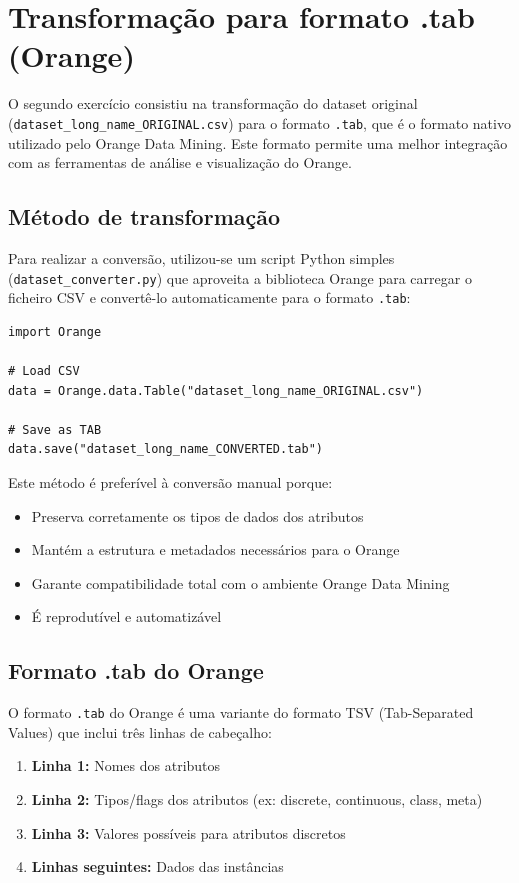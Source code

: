 \documentclass[12pt,a4paper]{article}
\begin{document}
\section{Transformação para formato .tab (Orange)}

O segundo exercício consistiu na transformação do dataset original (\texttt{dataset\_long\_name\_ORIGINAL.csv}) para o formato \texttt{.tab}, que é o formato nativo utilizado pelo Orange Data Mining. Este formato permite uma melhor integração com as ferramentas de análise e visualização do Orange.

\subsection{Método de transformação}

Para realizar a conversão, utilizou-se um script Python simples (\texttt{dataset\_converter.py}) que aproveita a biblioteca Orange para carregar o ficheiro CSV e convertê-lo automaticamente para o formato \texttt{.tab}:

\begin{verbatim}
import Orange

# Load CSV
data = Orange.data.Table("dataset_long_name_ORIGINAL.csv")

# Save as TAB
data.save("dataset_long_name_CONVERTED.tab")
\end{verbatim}

Este método é preferível à conversão manual porque:
\begin{itemize}
    \item Preserva corretamente os tipos de dados dos atributos
    \item Mantém a estrutura e metadados necessários para o Orange
    \item Garante compatibilidade total com o ambiente Orange Data Mining
    \item É reprodutível e automatizável
\end{itemize}

\subsection{Formato .tab do Orange}

O formato \texttt{.tab} do Orange é uma variante do formato TSV (Tab-Separated Values) que inclui três linhas de cabeçalho:
\begin{enumerate}
    \item \textbf{Linha 1:} Nomes dos atributos
    \item \textbf{Linha 2:} Tipos/flags dos atributos (ex: discrete, continuous, class, meta)
    \item \textbf{Linha 3:} Valores possíveis para atributos discretos
    \item \textbf{Linhas seguintes:} Dados das instâncias
\end{enumerate}
\end{document}
